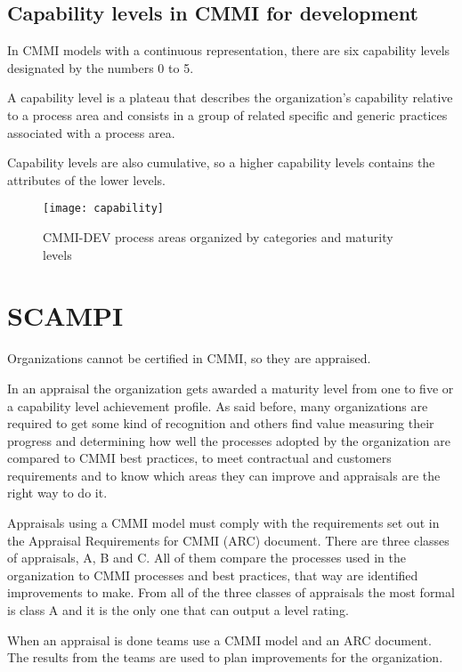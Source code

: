 \subsection{Capability levels in CMMI for development}

In CMMI models with a continuous representation, there are six capability levels designated by the numbers 0 to 5.

A capability level is a plateau that describes the organization's capability relative to a process area and consists in a group of related specific and generic practices associated with a process area.

Capability levels are also cumulative, so a higher capability levels contains the attributes of the lower levels.

\begin{figure}[h]
	\begin{center}
		\leavevmode
		\texttt{[image: capability]}
		\caption{CMMI-DEV process areas organized by categories and maturity levels}
		\label{fig:capabilitylevels}
	\end{center}
\end{figure}


\section{SCAMPI}
Organizations cannot be certified in CMMI, so they are appraised.

In an appraisal the organization gets awarded a maturity level from one to five or a capability level achievement profile. As said before, many organizations are required to get some kind of recognition and others find value measuring their progress and determining how well the processes adopted by the organization are compared to CMMI best practices, to meet contractual and customers requirements and to know which areas they can improve and appraisals are the right way to do it.

Appraisals using a CMMI model must comply with the requirements set out in the Appraisal Requirements for CMMI (ARC) document\citep{team2001appraisal}. There are three classes of appraisals, A, B and C. All of them compare the processes used in the organization to CMMI processes and best practices, that way are identified improvements to make. From all of the three classes of appraisals the most formal is class A and it is the only one that can output a level rating.

When an appraisal is done teams use a CMMI model and an ARC document. The results from the teams are used to plan improvements for the organization.

